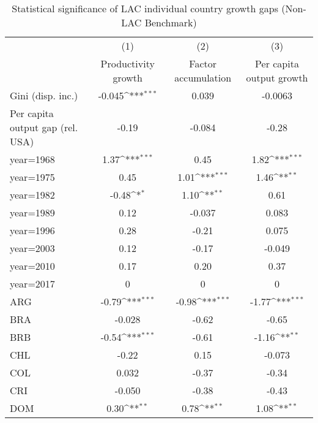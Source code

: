 \begin{sidewaystable}[htbp]\centering
\def\sym#1{\ifmmode^{#1}\else\(^{#1}\)\fi}
\caption{Statistical significance of LAC individual country growth gaps (Non-LAC Benchmark)}
\begin{tabular}{l*{3}{c}}
\toprule
                &\multicolumn{1}{c}{(1)}&\multicolumn{1}{c}{(2)}&\multicolumn{1}{c}{(3)}\\
                &\multicolumn{1}{c}{Productivity growth}&\multicolumn{1}{c}{Factor accumulation}&\multicolumn{1}{c}{Per capita output growth}\\
\midrule
Gini (disp. inc.)&   -0.045\sym{***}&    0.039         &  -0.0063         \\
Per capita output gap (rel. USA)&    -0.19         &   -0.084         &    -0.28         \\
year=1968       &     1.37\sym{***}&     0.45         &     1.82\sym{***}\\
year=1975       &     0.45         &     1.01\sym{***}&     1.46\sym{**} \\
year=1982       &    -0.48\sym{*}  &     1.10\sym{**} &     0.61         \\
year=1989       &     0.12         &   -0.037         &    0.083         \\
year=1996       &     0.28         &    -0.21         &    0.075         \\
year=2003       &     0.12         &    -0.17         &   -0.049         \\
year=2010       &     0.17         &     0.20         &     0.37         \\
year=2017       &        0         &        0         &        0         \\
ARG             &    -0.79\sym{***}&    -0.98\sym{***}&    -1.77\sym{***}\\
BRA             &   -0.028         &    -0.62         &    -0.65         \\
BRB             &    -0.54\sym{***}&    -0.61         &    -1.16\sym{**} \\
CHL             &    -0.22         &     0.15         &   -0.073         \\
COL             &    0.032         &    -0.37         &    -0.34         \\
CRI             &   -0.050         &    -0.38         &    -0.43         \\
DOM             &     0.30\sym{**} &     0.78\sym{**} &     1.08\sym{**} \\

\end{tabular}
\end{sidewaystable}
